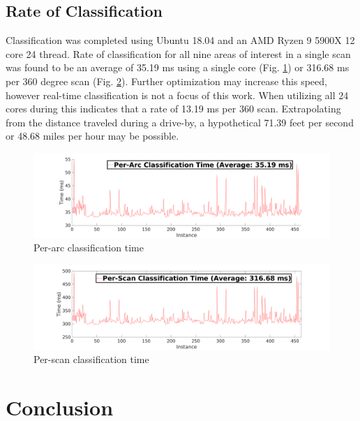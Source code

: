 \documentclass[numbered,pdftex]{ohio-etd}
\begin{document}
{{	\section{Rate of Classification}{
		
		{Classification was completed using Ubuntu 18.04 and an AMD Ryzen 9 5900X 12 core 24 thread. Rate of classification for all nine areas of interest in a single scan was found to be an average of 35.19 ms using a single core (Fig. \ref{fig:per_arc_classification_time}) or 316.68 ms per 360 degree scan (Fig. \ref{fig:per_scan_classification_rate}). Further optimization may increase this speed, however real-time classification is not a focus of this work. When utilizing all 24 cores during this indicates that a rate of 13.19 ms per 360 scan. Extrapolating from the distance traveled during a drive-by, a hypothetical 71.39 feet per second or 48.68 miles per hour may be possible.}
		
		\begin{figure}[H]
			\centering
			\includegraphics[width=0.9\linewidth]{Defense_Images/per_arc_classification_time}
			\caption[Per-Arc Time]{Per-arc classification time}
			\label{fig:per_arc_classification_time}
		\end{figure}
		
		\begin{figure}[H]
			\centering
			\includegraphics[width=0.9\linewidth]{Defense_Images/per_scan_classification_rate}
			\caption[Per-Scan Time]{Per-scan classification time}
			\label{fig:per_scan_classification_rate}
		\end{figure}
		
	}
		
} %


\chapter{Conclusion}
{
	
}}
\end{document}
